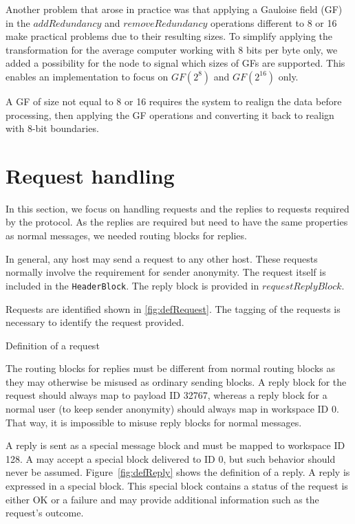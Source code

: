 Another problem that arose in practice was that applying a Gauloise field (GF) in the $addRedundancy$ and $removeRedundancy$ operations different to 8 or 16 make practical problems due to their resulting sizes. To simplify applying the transformation for the average computer working with 8 bits per byte only, we added a possibility for the node to signal which sizes of GFs are supported. This enables an implementation to focus on $GF(2^8)$ and $GF(2^{16})$ only.

A GF of size not equal to 8 or 16 requires the system to realign the data before processing, then applying the GF operations and converting it back to realign with 8-bit boundaries.

\section{Request handling}
In this section, we focus on handling requests and the replies to requests required by the protocol. As the replies are required but need to have the same properties as normal messages, we needed routing blocks for replies.

In general, any host may send a request to any other host. These requests normally involve the requirement for sender anonymity. The request itself is included in the \lstinline[columns=fixed,basicstyle=\normalsize]{HeaderBlock}. The reply block is provided in $requestReplyBlock$.

Requests are identified shown in \cref{fig:defRequest}. The tagging of the requests is necessary to identify the request provided.

\begin{lstfloat}[ht]
	
	\caption{Definition of a request}
	\label{fig:defRequest}
\end{lstfloat}

The routing blocks for replies must be different from normal routing blocks as they may otherwise be misused as ordinary sending blocks. A reply block for the request should always map to payload ID 32767, whereas a reply block for a normal user (to keep sender anonymity) should always map in workspace ID 0. That way, it is impossible to misuse reply blocks for normal messages.

A reply is sent as a special message block and must be mapped to workspace ID 128. A \VortexNode{} may accept a special block delivered to ID 0, but such behavior should never be assumed. Figure~\ref{fig:defReply} shows the definition of a reply. A reply is expressed in a special block. This special block contains a status of the request is either OK or a failure and may provide additional information such as the request's outcome.

